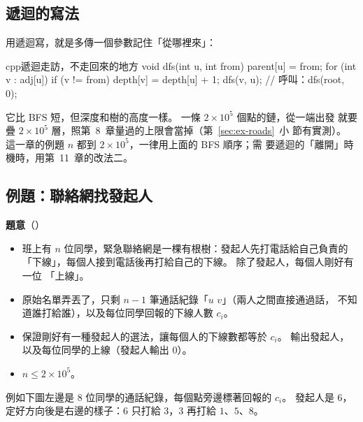 \subsection{遞迴的寫法}

用遞迴寫，就是多傳一個參數記住「從哪裡來」：

\begin{code}{cpp}{遞迴走訪，不走回來的地方}
void dfs(int u, int from) {
    parent[u] = from;
    for (int v : adj[u]) {
        if (v != from) {
            depth[v] = depth[u] + 1;
            dfs(v, u);
        }
    }
}
// 呼叫：dfs(root, 0);
\end{code}

它比 BFS 短，但深度和樹的高度一樣。 一條 $2 \times 10^5$ 個點的鏈，從一端出發
就要疊 $2 \times 10^5$ 層，照第~8~章量過的上限會當掉（第~\ref{sec:ex-roads}~小
節有實測）。 這一章的例題 $n$ 都到 $2 \times 10^5$，一律用上面的 BFS 順序；需
要遞迴的「離開」時機時，用第~11~章的改法二。

\subsection{例題：聯絡網找發起人}
\label{sec:ex-phonetree}

\textbf{題意}（）

\begin{itemize}
\item 班上有 $n$ 位同學，緊急聯絡網是一棵有根樹：發起人先打電話給自己負責的
「下線」，每個人接到電話後再打給自己的下線。 除了發起人，每個人剛好有一位
「上線」。
\item 原始名單弄丟了，只剩 $n - 1$ 筆通話紀錄「$u$ $v$」（兩人之間直接通過話，
不知道誰打給誰），以及每位同學回報的下線人數 $c_i$。
\item 保證剛好有一種發起人的選法，讓每個人的下線數都等於 $c_i$。 輸出發起人，
以及每位同學的上線（發起人輸出 $0$）。
\item $n \le 2 \times 10^5$。
\end{itemize}

例如下圖左邊是 $8$ 位同學的通話紀錄，每個點旁邊標著回報的 $c_i$。 發起人是
$6$，定好方向後是右邊的樣子：$6$ 只打給 $3$，$3$ 再打給 $1$、$5$、$8$。

